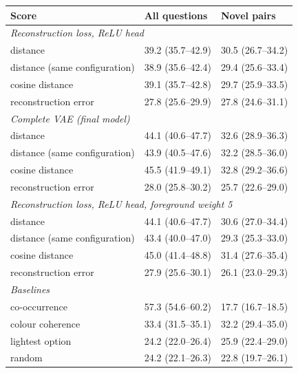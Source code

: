 \begin{tabular}{lll}
\toprule
Score & All questions & Novel pairs \\
\midrule
\multicolumn{3}{l}{\emph{Reconstruction loss, ReLU head}} \\
\quad distance & 39.2 (35.7--42.9) & 30.5 (26.7--34.2) \\
\quad distance (same configuration) & 38.9 (35.6--42.4) & 29.4 (25.6--33.4) \\
\quad cosine distance & 39.1 (35.7--42.8) & 29.7 (25.9--33.5) \\
\quad reconstruction error & 27.8 (25.6--29.9) & 27.8 (24.6--31.1) \\
\multicolumn{3}{l}{\emph{Complete VAE (final model)}} \\
\quad distance & 44.1 (40.6--47.7) & 32.6 (28.9--36.3) \\
\quad distance (same configuration) & 43.9 (40.5--47.6) & 32.2 (28.5--36.0) \\
\quad cosine distance & 45.5 (41.9--49.1) & 32.8 (29.2--36.6) \\
\quad reconstruction error & 28.0 (25.8--30.2) & 25.7 (22.6--29.0) \\
\multicolumn{3}{l}{\emph{Reconstruction loss, ReLU head, foreground weight 5}} \\
\quad distance & 44.1 (40.6--47.7) & 30.6 (27.0--34.4) \\
\quad distance (same configuration) & 43.4 (40.0--47.0) & 29.3 (25.3--33.0) \\
\quad cosine distance & 45.0 (41.4--48.8) & 31.4 (27.6--35.4) \\
\quad reconstruction error & 27.9 (25.6--30.1) & 26.1 (23.0--29.3) \\
\multicolumn{3}{l}{\emph{Baselines}} \\
\quad co-occurrence & 57.3 (54.6--60.2) & 17.7 (16.7--18.5) \\
\quad colour coherence & 33.4 (31.5--35.1) & 32.2 (29.4--35.0) \\
\quad lightest option & 24.2 (22.0--26.4) & 25.9 (22.4--29.0) \\
\quad random & 24.2 (22.1--26.3) & 22.8 (19.7--26.1) \\
\bottomrule
\end{tabular}

